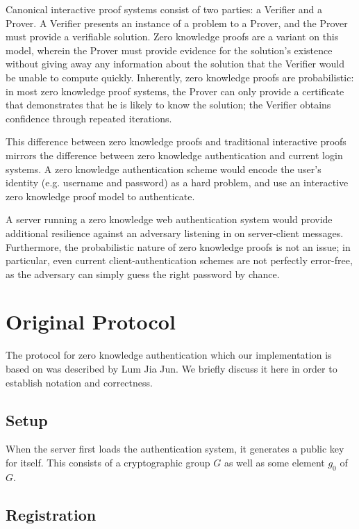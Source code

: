 \documentclass[11pt]{article}
\begin{document}
Canonical interactive proof systems consist of two parties: a Verifier and a Prover\cite{Goldwasser}.  A Verifier presents an instance of a problem to a Prover, and the Prover must provide a verifiable solution.  Zero knowledge proofs are a variant on this model, wherein the Prover must provide evidence for the solution’s existence without giving away any information about the solution that the Verifier would be unable to compute quickly.  Inherently, zero knowledge proofs are probabilistic: in most zero knowledge proof systems, the Prover can only provide a certificate that demonstrates that he is likely to know the solution; the Verifier obtains confidence through repeated iterations.

This difference between zero knowledge proofs and traditional interactive proofs mirrors the difference between zero knowledge authentication and current login systems.  A zero knowledge authentication scheme would encode the user’s identity (e.g. username and password) as a hard problem, and use an interactive zero knowledge proof model to authenticate.

A server running a zero knowledge web authentication system would provide additional resilience against an adversary listening in on server-client messages\cite{Goldwasser}.  Furthermore, the probabilistic nature of zero knowledge proofs is not an issue; in particular, even current client-authentication schemes are not perfectly error-free, as the adversary can simply guess the right password by chance.

\section{Original Protocol}
The protocol for zero knowledge authentication which our implementation is based on was described by Lum Jia Jun\cite{Lum}.  We briefly discuss it here in order to establish notation and correctness. 

\subsection{Setup}

When the server first loads the authentication system, it generates a public key for itself.  This consists of a cryptographic group $G$ as well as some element $g_0$ of $G$\cite{Lum}.

\subsection{Registration}
\end{document}
